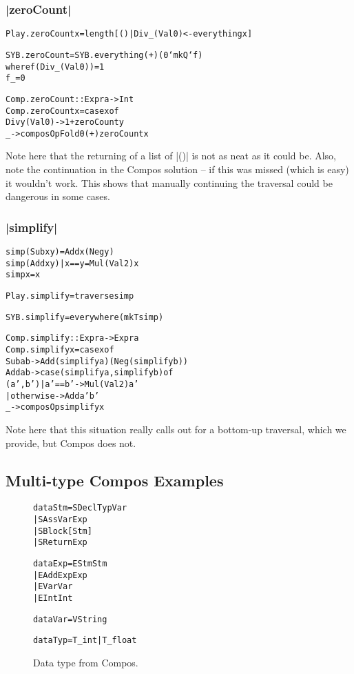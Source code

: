 \documentclass[preprint]{sigplanconf}
\newenvironment{code}{\begin{alltt}\small}{\end{alltt}}
\begin{document}
\subsubsection{|zeroCount|}

\begin{code}
Play.zeroCount x = length [() | Div _ (Val 0) <- everything x]

SYB.zeroCount = SYB.everything (+) (0 `mkQ` f)
    where  f (Div _ (Val 0))  = 1
           f _                  = 0

Comp.zeroCount :: Expr a -> Int
Comp.zeroCount x = case x of
    Div y (Val 0) -> 1 + zeroCount y
    _ -> composOpFold 0 (+) zeroCount x
\end{code}

Note here that the returning of a list of |()| is not as neat as it could be. Also, note the continuation in the Compos solution -- if this was missed (which is easy) it wouldn't work. This shows that manually continuing the traversal could be dangerous in some cases.

\subsubsection{|simplify|}

\begin{code}
simp (Sub x y)           = Add x (Neg y)
simp (Add x y) | x == y  = Mul (Val 2) x
simp x                   = x

Play.simplify = traverse simp

SYB.simplify = everywhere (mkT simp)

Comp.simplify :: Expr a -> Expr a
Comp.simplify x = case x of
    Sub  a b -> Add (simplify a) (Neg (simplify b))
    Add  a b -> case  (simplify a, simplify b) of
                      (a',b')  | a' == b'   -> Mul (Val 2) a'
                               | otherwise  -> Add a' b'
    _ -> composOp simplify x
\end{code}

Note here that this situation really calls out for a bottom-up traversal, which we provide, but Compos does not.


\subsection{Multi-type Compos Examples}

\begin{figure}
\begin{code}
data Stm  =  SDecl    Typ Var
          |  SAss     Var Exp
          |  SBlock   [Stm]
          |  SReturn  Exp

data Exp  =  EStm  Stm
          |  EAdd  Exp Exp
          |  EVar  Var
          |  EInt  Int

data Var  =  V String

data Typ  =  T_int | T_float
\end{code}
\caption{Data type from Compos.}
\label{fig:compos}
\end{figure}
\end{document}
